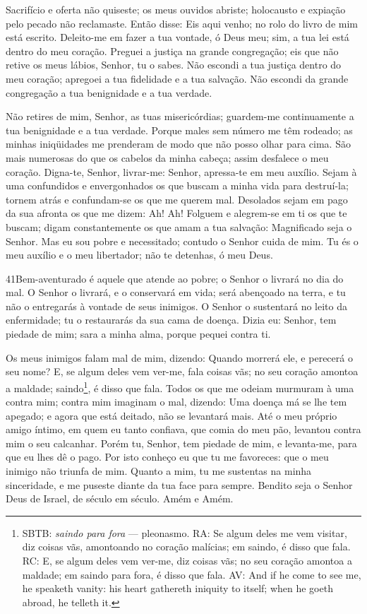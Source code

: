 Sacrifício e oferta não quiseste; os meus ouvidos abriste;
holocausto e expiação pelo pecado não reclamaste. Então disse:
Eis aqui venho; no rolo do livro de mim está escrito. Deleito-me
em fazer a tua vontade, ó Deus meu; sim, a tua lei está dentro do
meu coração. Preguei a justiça na grande congregação; eis que
não retive os meus lábios, Senhor, tu o sabes. Não escondi a
tua justiça dentro do meu coração; apregoei a tua fidelidade e a tua
salvação. Não escondi da grande congregação a tua benignidade e a
tua verdade.

Não retires de mim, Senhor, as tuas misericórdias; guardem-me
continuamente a tua benignidade e a tua verdade. Porque males
sem número me têm rodeado; as minhas iniqüidades me prenderam de
modo que não posso olhar para cima. São mais numerosas do que os
cabelos da minha cabeça; assim desfalece o meu coração.
Digna-te, Senhor, livrar-me: Senhor, apressa-te em meu
auxílio. Sejam à uma confundidos e envergonhados os que
buscam a minha vida para destruí-la; tornem atrás e confundam-se os
que me querem mal. Desolados sejam em pago da sua afronta os
que me dizem: Ah! Ah! Folguem e alegrem-se em ti os que te
buscam; digam constantemente os que amam a tua salvação: Magnificado
seja o Senhor. Mas eu sou pobre e necessitado; contudo o
Senhor cuida de mim. Tu és o meu auxílio e o meu libertador; não te
detenhas, ó meu Deus.

\bigskip

\lettrine{41}{}Bem-aventurado é aquele que atende ao pobre; o
Senhor o livrará no dia do mal. O Senhor o livrará, e o
conservará em vida; será abençoado na terra, e tu não o entregarás à
vontade de seus inimigos. O Senhor o sustentará no leito da
enfermidade; tu o restaurarás da sua cama de doença. Dizia eu:
Senhor, tem piedade de mim; sara a minha alma, porque pequei contra
ti.

Os meus inimigos falam mal de mim, dizendo: Quando morrerá ele, e
perecerá o seu nome? E, se algum deles vem ver-me, fala coisas
vãs; no seu coração amontoa a maldade; saindo\footnote{SBTB:
\emph{saindo para fora}
--- pleonasmo. RA: Se algum deles me vem visitar, diz coisas vãs, amontoando
no coração malícias; em saindo, é disso que fala. RC: E, se algum
deles vem ver-me, diz coisas vãs; no seu coração amontoa a maldade;
em saindo para fora, é disso que fala. AV: And if he come to see me,
he speaketh vanity: his heart gathereth iniquity to itself; when he
goeth abroad, he telleth it.}, é disso que fala. Todos os que me
odeiam murmuram à uma contra mim; contra mim imaginam o mal,
dizendo: Uma doença má se lhe tem apegado; e agora que está
deitado, não se levantará mais. Até o meu próprio amigo íntimo,
em quem eu tanto confiava, que comia do meu pão, levantou contra mim
o seu calcanhar. Porém tu, Senhor, tem piedade de mim, e
levanta-me, para que eu lhes dê o pago. Por isto conheço eu
que tu me favoreces: que o meu inimigo não triunfa de mim.
Quanto a mim, tu me sustentas na minha sinceridade, e me
puseste diante da tua face para sempre. Bendito seja o Senhor
Deus de Israel, de século em século. Amém e Amém.

